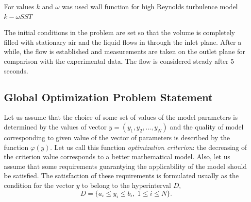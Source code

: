 \documentclass[sensors,article,submit,moreauthors,pdftex]{Definitions/mdpi}
\begin{document}

For values $k$ and $\omega$ was used wall function for high Reynolds turbulence model $k-\omega SST$

The initial conditions in the problem are set so that the volume is completely filled with stationary air and the liquid flows in through the inlet plane. After a while, the flow is established and measurements are taken on the outlet plane for comparison with the experimental data. The flow is considered steady after 5 seconds.















\subsection{Global Optimization Problem Statement}
Let us assume that the choice of some set of values of the model parameters is determined by the values of vector $y=(y_1,y_2,...,y_N)$ and the quality of model corresponding to given value of the vector of parameters is described by the function $\varphi(y)$. Let us call this function \textit{optimization criterion}: the decreasing of the criterion value corresponds to a better mathematical model. Also, let us assume that some requirements guarantying the applicability of the model should be satisfied. The satisfaction of these requirements is formulated usually as the condition for the vector $y$ to belong to the hyperinterval $D$,
\[
D=\{a_i \leq y_i \leq b_i, \; 1 \leq i \leq N\}.
\]
\end{document}
